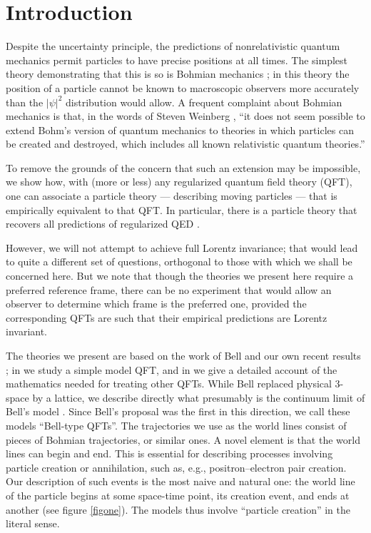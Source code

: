 \documentclass[12pt, showpacs, superscriptaddress]{revtex4-2}%
\begin{document}
\newpage

\section{Introduction}

Despite the uncertainty principle, the predictions
of nonrelativistic quantum mechanics permit particles to have precise
positions at all times.  The simplest theory demonstrating that this
is so is Bohmian mechanics \cite{Bohm52,Ischia,Stanford}; in this
theory the position of a particle cannot be known to macroscopic
observers more accurately than the $|\psi|^2$ distribution would
allow.  A frequent complaint about Bohmian mechanics is that, in the
words of Steven Weinberg \cite{weinlet}, ``it does not seem possible
to extend Bohm's version of quantum mechanics to theories in which
particles can be created and destroyed, which includes all known
relativistic quantum theories.''

To remove the grounds of the concern that such an extension may be
impossible, we show how, with (more or less) any regularized quantum
field theory (QFT), one can associate a particle theory --- describing
moving particles --- that is empirically equivalent to that QFT. In
particular, there is a particle theory that recovers all predictions
of regularized QED \cite{footn1}.

However, we will not attempt to achieve full Lorentz invariance; that
would lead to quite a different set of questions, orthogonal to those
with which we shall be concerned here. But we note that though the
theories we present here require a preferred reference frame, there
can be no experiment that would allow an observer to determine which
frame is the preferred one, provided the corresponding QFTs are such
that their empirical predictions are Lorentz invariant.

The theories we present are based on the work of Bell
\cite{BellBeables} and our own recent results
\cite{crea1,crea2a,crea2b}; in \cite{crea1} we study a simple model
QFT, and in \cite{crea2a,crea2b} we give a detailed account of the
mathematics needed for treating other QFTs.  While Bell replaced
physical 3-space by a lattice, we describe directly what presumably is
the continuum limit of Bell's model \cite{crea2a,crea2b,Sudbery,Vink}.
Since Bell's proposal was the first in this direction, we call these
models ``Bell-type QFTs''.  The trajectories we use as the world lines
consist of pieces of Bohmian trajectories, or similar ones.  A novel
element is that the world lines can begin and end.  This is essential
for describing processes involving particle creation or annihilation,
such as, e.g., positron--electron pair creation.  Our description of
such events is the most naive and natural one: the world line of the
particle begins at some space-time point, its creation event, and ends
at another (see figure \ref{figone}).  The models thus involve
``particle creation'' in the literal sense.
\end{document}
